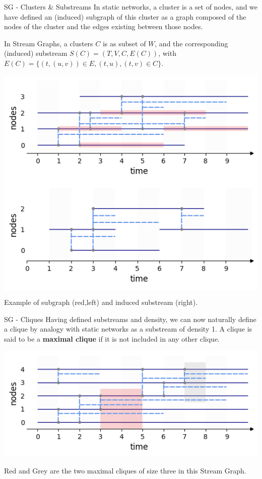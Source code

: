 \documentclass[a4paper,11pt]{book}
\begin{document}
\begin{textbox}{SG - Clusters \& Substreams}
In static networks, a cluster is a set of nodes, and we have defined an (induced) subgraph of this cluster as a graph composed of the nodes of the cluster and the edges existing between those nodes.

In Stream Graphs, a clusters $C$ is as subset of $W$, and the corresponding (induced) substream $S(C)=(T,V,C,E(C))$, with $E(C)=\{(t,(u,v)) \in E, (t,u),(t,v) \in C\}$.

\centering

\vspace{0.3cm}

\colorbox{white}{\includegraphics[width=0.45\linewidth]{pics/dynamic/cluster.png}}
\colorbox{white}{\includegraphics[width=0.45\linewidth]{pics/dynamic/subnet.png}}

Example of subgraph (red,left) and induced substream (right).

\end{textbox}







\begin{textbox}{SG - Cliques}
Having defined substreams and density, we can now naturally define a clique by analogy with static networks as a substream of density 1. A clique is said to be a \textbf{maximal clique} if it is not included in any other clique.

\centering

\vspace{0.3cm}

\includegraphics[width=0.9\linewidth]{pics/dynamic/cliques.png}

Red and Grey are the two maximal cliques of size three in this Stream Graph.

\end{textbox}
\end{document}
